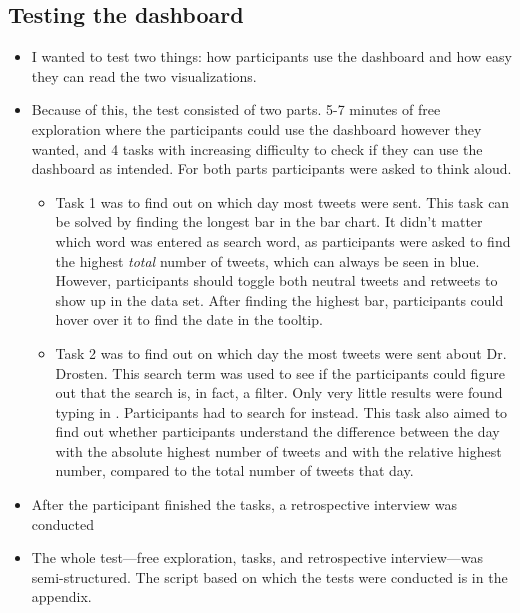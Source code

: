 \subsection{Testing the dashboard}
\begin{itemize}
    \item I wanted to test two things: how participants use the dashboard and how easy they can read the two visualizations.
    \item Because of this, the test consisted of two parts. 5-7 minutes of free exploration where the participants could use the dashboard however they wanted, and 4 tasks with increasing difficulty to check if they can use the dashboard as intended. For both parts participants were asked to think aloud.
    \begin{itemize}
        \item Task 1 was to find out on which day most tweets were sent. This task can be solved by finding the longest bar in the bar chart. It didn't matter which word was entered as search word, as participants were asked to find the highest \emph{total} number of tweets, which can always be seen in blue. However, participants should toggle both neutral tweets and retweets to show up in the data set. After finding the highest bar, participants could hover over it to find the date in the tooltip.
        \item Task 2 was to find out on which day the most tweets were sent about Dr. Drosten. This search term was used to see if the participants could figure out that the search is, in fact, a filter. Only very little results were found typing in . Participants had to search for  instead. This task also aimed to find out whether participants understand the difference between the day with the absolute highest number of tweets and with the relative highest number, compared to the total number of tweets that day.
    \end{itemize}
    \item After the participant finished the tasks, a retrospective interview was conducted
    \item The whole test---free exploration, tasks, and retrospective interview---was semi-structured. The script based on which the tests were conducted is in the appendix.
\end{itemize}